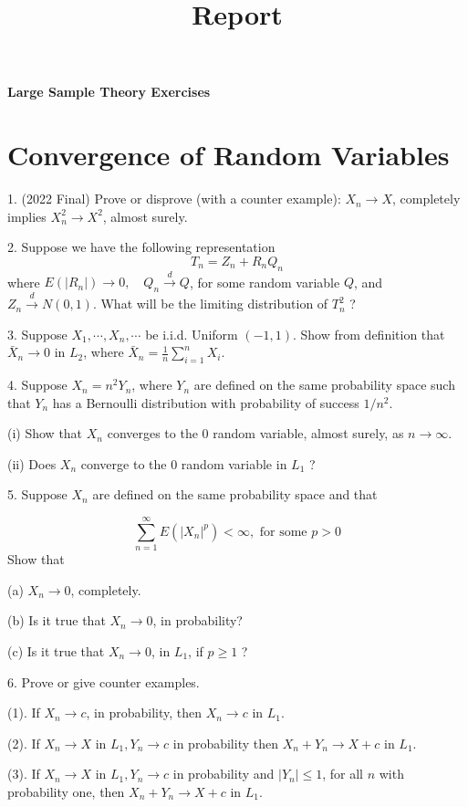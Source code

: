 \documentclass[11pt]{article}
\theoremstyle{definition}
\begin{document}
\title{Report}

\thispagestyle{empty}

\begin{center}
{\LARGE \bf Large Sample Theory Exercises}\\
\end{center}
\tableofcontents
\newpage
\section{Convergence of Random Variables}
1. (2022 Final) Prove or disprove (with a counter example): $X_n \rightarrow X$, completely implies $X_n^2 \rightarrow X^2$, almost surely.

2. Suppose we have the following representation
$$
T_n=Z_n+R_n Q_n
$$
where $E\left(\left|R_n\right|\right) \rightarrow 0, \quad Q_n \xrightarrow{d} Q$, for some random variable $Q$, and $Z_n \xrightarrow{d} N(0,1)$. What will be the limiting distribution of $T_n^2$ ?

3. Suppose $X_1, \cdots, X_n, \cdots$ be i.i.d. Uniform $(-1,1)$. Show from definition that $\bar{X}_n \rightarrow 0$ in $L_2$, where $\bar{X}_n=\frac{1}{n} \sum_{i=1}^n X_i$.

4. Suppose $X_n=n^2 Y_n$, where $Y_n$ are defined on the same probability space such that $Y_n$ has a Bernoulli distribution with probability of success $1 / n^2$.

(i) Show that $X_n$ converges to the 0 random variable, almost surely, as $n \rightarrow \infty$.

(ii) Does $X_n$ converge to the 0 random variable in $L_1$ ?

5. Suppose $X_n$ are defined on the same probability space and that

$$
\sum_{n=1}^{\infty} E\left(\left|X_n\right|^p\right)<\infty, \text { for some } p>0
$$
Show that

(a) $X_n \rightarrow 0$, completely.

(b) Is it true that $X_n \rightarrow 0$, in probability?

(c) Is it true that $X_n \rightarrow 0$, in $L_1$, if $p \geq 1$ ?


6. Prove or give counter examples.

(1). If $X_n \rightarrow c$, in probability, then $X_n \rightarrow c$ in $L_1$.

(2). If $X_n \rightarrow X$ in $L_1, Y_n \rightarrow c$ in probability then $X_n+Y_n \rightarrow X+c$ in $L_1$.

(3). If $X_n \rightarrow X$ in $L_1, Y_n \rightarrow c$ in probability and $\left|Y_n\right| \leq 1$, for all $n$ with probability one, then $X_n+Y_n \rightarrow X+c$ in $L_1$.
\end{document}
